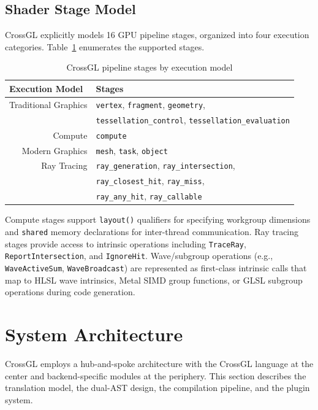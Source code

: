 \documentclass{svproc}
\begin{document}
\subsection{Shader Stage Model}

CrossGL explicitly models 16 GPU pipeline stages, organized into four execution categories. Table~\ref{tab:stages} enumerates the supported stages.

\begin{table}
\caption{CrossGL pipeline stages by execution model}
\label{tab:stages}
\begin{center}
\begin{tabular}{r@{\quad}l}
\hline
\multicolumn{1}{l}{\rule{0pt}{12pt}\textbf{Execution Model}} & \textbf{Stages} \\[2pt]
\hline\rule{0pt}{12pt}
Traditional Graphics & \texttt{vertex}, \texttt{fragment}, \texttt{geometry}, \\
& \texttt{tessellation\_control}, \texttt{tessellation\_evaluation} \\
Compute & \texttt{compute} \\
Modern Graphics & \texttt{mesh}, \texttt{task}, \texttt{object} \\
Ray Tracing & \texttt{ray\_generation}, \texttt{ray\_intersection}, \\
& \texttt{ray\_closest\_hit}, \texttt{ray\_miss}, \\
& \texttt{ray\_any\_hit}, \texttt{ray\_callable} \\[2pt]
\hline
\end{tabular}
\end{center}
\end{table}

Compute stages support \texttt{layout()} qualifiers for specifying workgroup dimensions and \texttt{shared} memory declarations for inter-thread communication. Ray tracing stages provide access to intrinsic operations including \texttt{TraceRay}, \texttt{ReportIntersection}, and \texttt{IgnoreHit}. Wave/subgroup operations (e.g., \texttt{WaveActiveSum}, \texttt{WaveBroadcast}) are represented as first-class intrinsic calls that map to HLSL wave intrinsics, Metal SIMD group functions, or GLSL subgroup operations during code generation.
\section{System Architecture}

CrossGL employs a hub-and-spoke architecture with the CrossGL language at the center and backend-specific modules at the periphery. This section describes the translation model, the dual-AST design, the compilation pipeline, and the plugin system.
\end{document}
